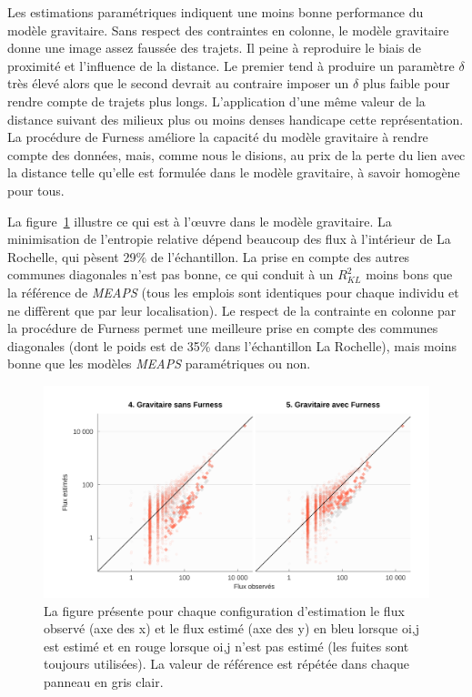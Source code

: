 \documentclass[
  10pt,
  a4paper,
  numbers=noendperiod,
  DIV=9]{scrartcl}
\begin{document}
Les estimations paramétriques indiquent une moins bonne performance du
modèle gravitaire. Sans respect des contraintes en colonne, le modèle
gravitaire donne une image assez faussée des trajets. Il peine à
reproduire le biais de proximité et l'influence de la distance. Le
premier tend à produire un paramètre \(\delta\) très élevé alors que le
second devrait au contraire imposer un \(\delta\) plus faible pour
rendre compte de trajets plus longs. L'application d'une même valeur de
la distance suivant des milieux plus ou moins denses handicape cette
représentation. La procédure de Furness améliore la capacité du modèle
gravitaire à rendre compte des données, mais, comme nous le disions, au
prix de la perte du lien avec la distance telle qu'elle est formulée
dans le modèle gravitaire, à savoir homogène pour tous.

La figure~\ref{fig-actvsfit-grav} illustre ce qui est à l'œuvre dans le
modèle gravitaire. La minimisation de l'entropie relative dépend
beaucoup des flux à l'intérieur de La Rochelle, qui pèsent 29\% de
l'échantillon. La prise en compte des autres communes diagonales n'est
pas bonne, ce qui conduit à un \(R^2_{KL}\) moins bons que la référence
de \emph{MEAPS} (tous les emplois sont identiques pour chaque individu
et ne diffèrent que par leur localisation). Le respect de la contrainte
en colonne par la procédure de Furness permet une meilleure prise en
compte des communes diagonales (dont le poids est de 35\% dans
l'échantillon La Rochelle), mais moins bonne que les modèles
\emph{MEAPS} paramétriques ou non.

\begin{figure}[htb]

{\centering \includegraphics[width=1\textwidth,height=\textheight]{larochelle_files/figure-pdf/fig-actvsfit-grav-1.png}

}

\caption[\emph{MEAPS} observés versus
estimés]{\label{fig-actvsfit-grav}La figure présente pour chaque
configuration d'estimation le flux observé (axe des x) et le flux estimé
(axe des y) en bleu lorsque oi,j est estimé et en rouge lorsque oi,j
n'est pas estimé (les fuites sont toujours utilisées). La valeur de
référence est répétée dans chaque panneau en gris clair.}

\end{figure}
\end{document}
